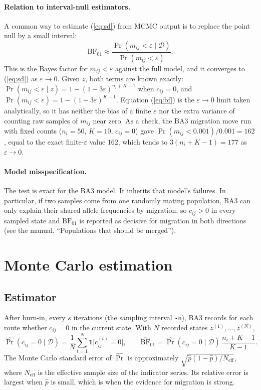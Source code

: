 \documentclass[11pt,a4paper]{article}
\newcommand{\BF}{\mathrm{BF}}
\newcommand{\data}{\mathcal{D}}
\newcommand{\1}{\mathbf{1}}
\begin{document}
\paragraph{Relation to interval-null estimators.}
A common way to estimate (\ref{eq:sd}) from MCMC output is to replace the point
null by a small interval:
\[
\BF_{01} \approx \frac{\Pr(m_{ij}<\varepsilon\mid\data)}{\Pr(m_{ij}<\varepsilon)}.
\]
This is the Bayes factor for $m_{ij}<\varepsilon$ against the full model, and it
converges to (\ref{eq:sd}) as $\varepsilon\to 0$. Given $z$, both terms are
known exactly: $\Pr(m_{ij}<\varepsilon\mid z) = 1-(1-3\varepsilon)^{n_i+K-1}$
when $c_{ij}=0$, and $\Pr(m_{ij}<\varepsilon) = 1-(1-3\varepsilon)^{K-1}$.
Equation (\ref{eq:bf}) is the $\varepsilon\to 0$ limit taken analytically, so
it has neither the bias of a finite $\varepsilon$ nor the extra variance of
counting raw samples of $m_{ij}$ near zero. As a check, the BA3 migration move
run with fixed counts ($n_i=50$, $K=10$, $c_{ij}=0$) gave
$\Pr(m_{ij}<0.001)/0.001 = 162$, equal to the exact finite-$\varepsilon$ value
$162$, which tends to $3(n_i+K-1)=177$ as $\varepsilon\to 0$.

\paragraph{Model misspecification.}
The test is exact for the BA3 model. It inherits that model's failures. In
particular, if two samples come from one randomly mating population, BA3 can
only explain their shared allele frequencies by migration, so $c_{ij}>0$ in
every sampled state and $\BF_{01}$ is reported as decisive for migration in
both directions (see the manual, ``Populations that should be merged'').

\section{Monte Carlo estimation}
\label{sec:mc}

\subsection{Estimator}

After burn-in, every $s$ iterations (the sampling interval \texttt{-n}), BA3
records for each route whether $c_{ij}=0$ in the current state. With $N$
recorded states $z^{(1)},\ldots,z^{(N)}$,
\begin{equation}
\widehat{\Pr}(c_{ij}=0\mid\data) = \frac{1}{N}\sum_{t=1}^N \1\big[c_{ij}^{(t)}=0\big],
\qquad
\widehat{\BF}_{01} = \widehat{\Pr}(c_{ij}=0\mid\data)\,\frac{n_i+K-1}{K-1}.
\end{equation}
The Monte Carlo standard error of $\widehat{\Pr}$ is approximately
$\sqrt{\hat p(1-\hat p)/N_{\text{eff}}}$, where $N_{\text{eff}}$ is the
effective sample size of the indicator series. Its relative error is largest
when $\hat p$ is small, which is when the evidence for migration is strong.
\end{document}
